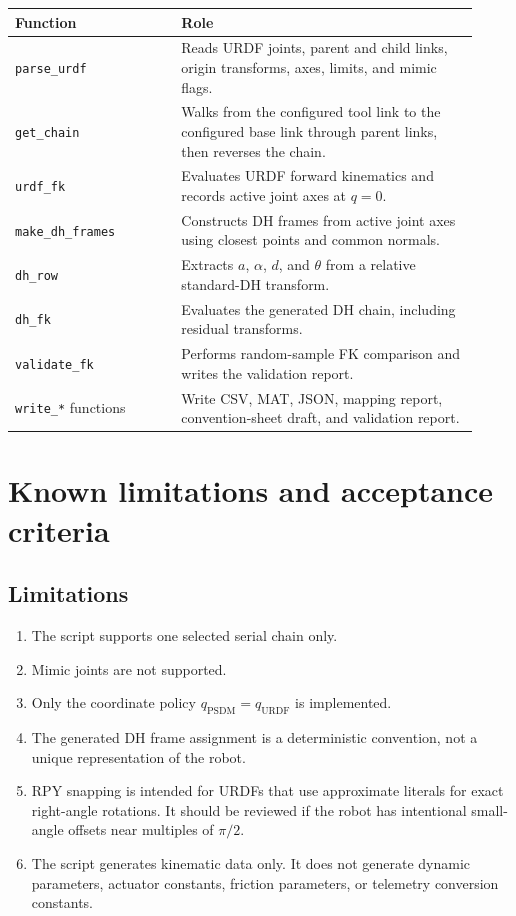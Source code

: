 \documentclass[11pt,a4paper]{article}
\begin{document}
\begin{longtable}{@{}p{0.33\linewidth}p{0.59\linewidth}@{}}
\toprule
Function & Role \\
\midrule
\texttt{parse\_urdf} & Reads URDF joints, parent and child links, origin transforms, axes, limits, and mimic flags. \\
\texttt{get\_chain} & Walks from the configured tool link to the configured base link through parent links, then reverses the chain. \\
\texttt{urdf\_fk} & Evaluates URDF forward kinematics and records active joint axes at $q=0$. \\
\texttt{make\_dh\_frames} & Constructs DH frames from active joint axes using closest points and common normals. \\
\texttt{dh\_row} & Extracts $a$, $\alpha$, $d$, and $\theta$ from a relative standard-DH transform. \\
\texttt{dh\_fk} & Evaluates the generated DH chain, including residual transforms. \\
\texttt{validate\_fk} & Performs random-sample FK comparison and writes the validation report. \\
\texttt{write\_*} functions & Write CSV, MAT, JSON, mapping report, convention-sheet draft, and validation report. \\
\bottomrule
\end{longtable}

\section{Known limitations and acceptance criteria}

\subsection{Limitations}

\begin{enumerate}
  \item The script supports one selected serial chain only.
  \item Mimic joints are not supported.
  \item Only the coordinate policy $q_{\mathrm{PSDM}}=q_{\mathrm{URDF}}$ is implemented.
  \item The generated DH frame assignment is a deterministic convention, not a unique representation of the robot.
  \item RPY snapping is intended for URDFs that use approximate literals for exact right-angle rotations. It should be reviewed if the robot has intentional small-angle offsets near multiples of $\pi/2$.
  \item The script generates kinematic data only. It does not generate dynamic parameters, actuator constants, friction parameters, or telemetry conversion constants.
\end{enumerate}
\end{document}
